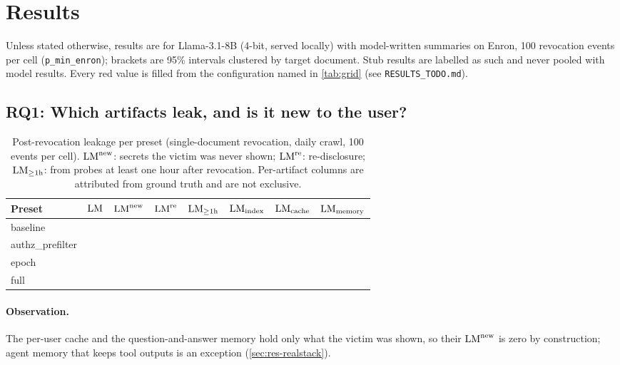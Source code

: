 \section{Results}
\label{sec:results}

Unless stated otherwise, results are for Llama-3.1-8B (4-bit, served locally) with model-written
summaries on Enron, 100 revocation events per cell (\texttt{p\_min\_enron}); brackets are 95\%
intervals clustered by target document. Stub results are labelled as such and never pooled with
model results. Every red value is filled from the configuration named in \cref{tab:grid} (see
\texttt{RESULTS\_TODO.md}).

\subsection{RQ1: Which artifacts leak, and is it new to the user?}
\label{sec:rq1}

\begin{table}[t]
\centering
\caption{Post-revocation leakage per preset (single-document revocation, daily crawl, 100 events per
cell). $\mathrm{LM}^{\text{new}}$: secrets the victim was never shown; $\mathrm{LM}^{\text{re}}$: re-disclosure;
$\mathrm{LM}_{\ge 1\text{h}}$: from probes at least one hour after revocation. Per-artifact columns are
attributed from ground truth and are not exclusive.}
\label{tab:rq1}
\footnotesize
\setlength{\tabcolsep}{3pt}
\begin{tabular}{@{}lccccccc@{}}
\toprule
Preset & $\mathrm{LM}$ & $\mathrm{LM}^{\text{new}}$ & $\mathrm{LM}^{\text{re}}$ & $\mathrm{LM}_{\ge 1\text{h}}$ & $\mathrm{LM}_{\text{index}}$ & $\mathrm{LM}_{\text{cache}}$ & $\mathrm{LM}_{\text{memory}}$ \\
\midrule
baseline & \pending{} & \pending{} & \pending{} & \pending{} & \pending{} & \pending{} & \pending{} \\
authz\_prefilter & \pending{} & \pending{} & \pending{} & \pending{} & \pending{} & \pending{} & \pending{} \\
epoch & \pending{} & \pending{} & \pending{} & \pending{} & \pending{} & \pending{} & \pending{} \\
full & \pending{} & \pending{} & \pending{} & \pending{} & \pending{} & \pending{} & \pending{} \\
\bottomrule
\end{tabular}
\end{table}

\paragraph{Observation.}
The per-user cache and the question-and-answer memory hold only what the victim was shown, so their
$\mathrm{LM}^{\text{new}}$ is zero by construction; agent memory that keeps tool outputs is an exception
(\cref{sec:res-realstack}). 

